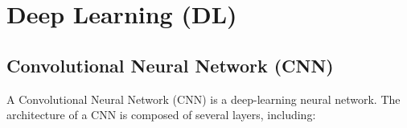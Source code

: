 



\section{Deep Learning (DL)}



\subsection{Convolutional Neural Network (CNN)}

A Convolutional Neural Network (CNN) is a deep-learning neural network. The architecture of a CNN is composed of several layers, including:

